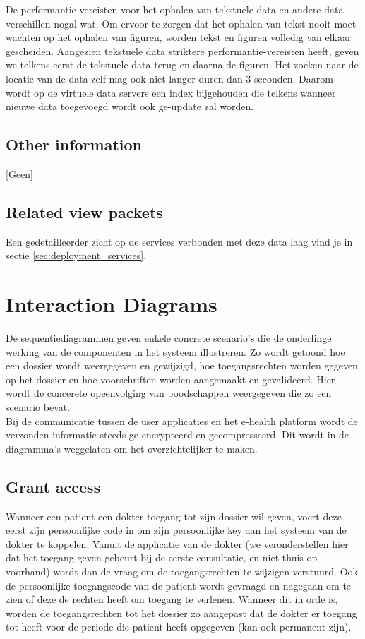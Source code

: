 \documentclass[a4paper,10pt]{article}
\begin{document}
De performantie-vereisten voor het ophalen van tekstuele data en andere data verschillen nogal wat. Om ervoor te zorgen dat het ophalen van tekst nooit moet wachten op het ophalen van figuren, worden tekst en figuren volledig van elkaar gescheiden. Aangezien tekstuele data striktere performantie-vereisten heeft, geven we telkens eerst de tekstuele data terug en daarna de figuren. Het zoeken naar de locatie van de data zelf mag ook niet langer duren dan 3 seconden. Daarom wordt op de virtuele data servers een index bijgehouden die telkens wanneer nieuwe data toegevoegd wordt ook ge-update zal worden.

\subsection{Other information}
[Geen]

\subsection{Related view packets}
Een gedetailleerder zicht op de services verbonden met deze data laag vind je in sectie \ref{sec:deployment_services}.

\clearpage
\section{Interaction Diagrams}
\label{interaction:main}
De sequentiediagrammen geven enkele concrete scenario's die de onderlinge werking van de componenten in het systeem illustreren. Zo wordt getoond hoe een dossier wordt weergegeven en gewijzigd, hoe toegangsrechten worden gegeven op het dossier en hoe voorschriften worden aangemaakt en gevalideerd. Hier wordt de concerete opeenvolging van boodschappen weergegeven die zo een scenario bevat.\\

Bij de communicatie tussen de user applicaties en het e-health platform wordt de verzonden informatie steeds ge-encrypteerd en gecompresseerd. Dit wordt in de diagramma's weggelaten om het overzichtelijker te maken. 


\subsection{Grant access}
\label{interaction:grantAccess}
Wanneer een patient een dokter toegang tot zijn dossier wil geven, voert deze eerst zijn persoonlijke code in om zijn persoonlijke key aan het systeem van de dokter te koppelen. Vanuit de applicatie van de dokter (we veronderstellen hier dat het toegang geven gebeurt bij de eerste consultatie, en niet thuis op voorhand) wordt dan de vraag om de toegangsrechten te wijzigen verstuurd. Ook de persoonlijke toegangscode van de patient wordt gevraagd en nagegaan om te zien of deze de rechten heeft om toegang te verlenen. Wanneer dit in orde is, worden de toegangsrechten tot het dossier zo aangepast dat de dokter er toegang tot heeft voor de periode die patient heeft opgegeven (kan ook permanent zijn). 
\end{document}
